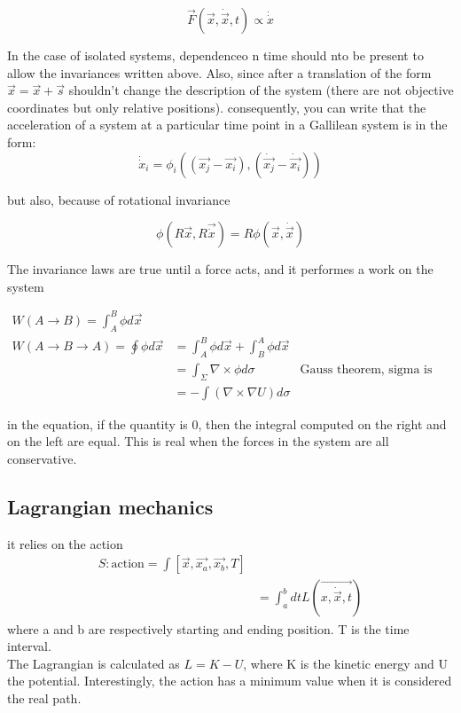 $$
\vec{F}(\vec{x}, \dot{\vec{x}}, t) \propto \dot{\dot{x}}
$$

In the case of isolated systems, dependenceo n time should nto be present to allow the invariances written above. Also, since after a translation of the form $\vec{x} = \vec{x} + \vec{s}$ shouldn't change the description of the system (there are not objective coordinates but only relative positions). consequently, you can write that the acceleration of a system at a particular time point in a Gallilean system is in the form:
$$
\dot{\dot{x}}_i = \phi_i\left(({\vec{x_j} - \vec{x_i}}), ({\dot{\vec{x_j}} - \dot{\vec{x_i}}})\right)
$$

but also, because of rotational invariance

$$
\phi\left(R \vec{x}, R \vec{\dot{x}} \right) =  R \phi(\vec{x}, \dot{\vec{x}})
$$

The invariance laws are true until a force acts, and it performes a work on the system

\begin{align*}
    W(A \rightarrow B) = \int_A^B{\phi d \vec{x}} \\
    W(A \rightarrow B \rightarrow A) = \oint{\phi d \vec{x}} &= \int_A^B{\phi d \vec{x}} + \int_B^A{\phi d \vec{x}}& \\
    & = \int_\Sigma {\nabla \times \phi d\sigma} &\text{Gauss theorem, sigma is the surface enclosed by path} \\
    & = - \int{\left(\nabla \times \nabla U\right) d \sigma}
\end{align*}

in the equation, if the quantity is 0, then the integral computed on the right and on the left are equal. This is real when the forces in the system are all conservative.

\subsection{Lagrangian mechanics}
it relies on the action
\begin{align*}
S : \text{action} = \int{[\vec{x}, \vec{x_a}, \vec{x_b}, T]}\\
                &= \int_a^b{dt L(\vec{x, \dot{\vec{x}}, t})}
\end{align*}
where a and b are respectively starting and ending position. T is the time interval.\\
The Lagrangian is calculated as $L = K - U$, where K is the kinetic energy and U the potential.
Interestingly, the action has a minimum value when it is considered the real path.

